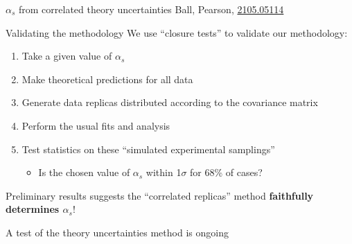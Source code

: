 \documentclass[8pt,t]{beamer}
\begin{document}
\begin{frame}{$\alpha_s$ from correlated theory uncertainties}
  \vspace*{1em}
  {\color{gray} \footnotesize Ball, Pearson, \hyperlink{https://arxiv.org/abs/2105.05114}{2105.05114}}

\end{frame}


\begin{frame}{Validating the methodology}
  We use ``closure tests'' to validate our methodology:
  \begin{enumerate}
    \item Take a given value of $\alpha_s$
    \item Make theoretical predictions for all data
    \item Generate data replicas distributed according to the covariance matrix
    \item Perform the usual fits and analysis
    \item Test statistics on these ``simulated experimental samplings''
    \begin{itemize}
      \item Is the chosen value of $\alpha_s$ within 1$\sigma$ for 68\% of cases?
    \end{itemize}
  \end{enumerate}

  \vspace{1em}
  Preliminary results suggests the “correlated replicas” method \textbf{faithfully determines $\alpha_s$}!

  \vspace{1em}
  A test of the theory uncertainties method is ongoing
\end{frame}
\end{document}

